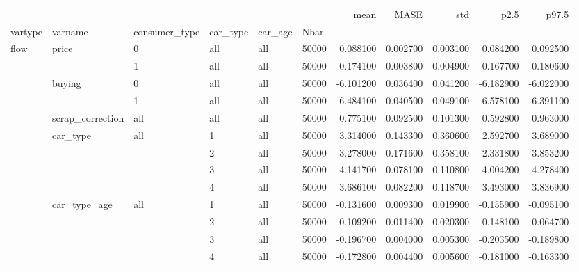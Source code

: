 \begin{tabular}{llllllrrrrr}
\toprule
 &  &  &  &  &  & mean & MASE & std & p2.5 & p97.5 \\
vartype & varname & consumer_type & car_type & car_age & Nbar &  &  &  &  &  \\
\midrule
\multirow[t]{13}{*}{flow} & \multirow[t]{2}{*}{price} & 0 & all & all & 50000 & 0.088100 & 0.002700 & 0.003100 & 0.084200 & 0.092500 \\
\cline{3-11} \cline{4-11} \cline{5-11}
 &  & 1 & all & all & 50000 & 0.174100 & 0.003800 & 0.004900 & 0.167700 & 0.180600 \\
\cline{2-11} \cline{3-11} \cline{4-11} \cline{5-11}
 & \multirow[t]{2}{*}{buying} & 0 & all & all & 50000 & -6.101200 & 0.036400 & 0.041200 & -6.182900 & -6.022000 \\
\cline{3-11} \cline{4-11} \cline{5-11}
 &  & 1 & all & all & 50000 & -6.484100 & 0.040500 & 0.049100 & -6.578100 & -6.391100 \\
\cline{2-11} \cline{3-11} \cline{4-11} \cline{5-11}
 & scrap_correction & all & all & all & 50000 & 0.775100 & 0.092500 & 0.101300 & 0.592800 & 0.963000 \\
\cline{2-11} \cline{3-11} \cline{4-11} \cline{5-11}
 & \multirow[t]{4}{*}{car_type} & \multirow[t]{4}{*}{all} & 1 & all & 50000 & 3.314000 & 0.143300 & 0.360600 & 2.592700 & 3.689000 \\
\cline{4-11} \cline{5-11}
 &  &  & 2 & all & 50000 & 3.278000 & 0.171600 & 0.358100 & 2.331800 & 3.853200 \\
\cline{4-11} \cline{5-11}
 &  &  & 3 & all & 50000 & 4.141700 & 0.078100 & 0.110800 & 4.004200 & 4.278400 \\
\cline{4-11} \cline{5-11}
 &  &  & 4 & all & 50000 & 3.686100 & 0.082200 & 0.118700 & 3.493000 & 3.836900 \\
\cline{2-11} \cline{3-11} \cline{4-11} \cline{5-11}
 & \multirow[t]{4}{*}{car_type_age} & \multirow[t]{4}{*}{all} & 1 & all & 50000 & -0.131600 & 0.009300 & 0.019900 & -0.155900 & -0.095100 \\
\cline{4-11} \cline{5-11}
 &  &  & 2 & all & 50000 & -0.109200 & 0.011400 & 0.020300 & -0.148100 & -0.064700 \\
\cline{4-11} \cline{5-11}
 &  &  & 3 & all & 50000 & -0.196700 & 0.004000 & 0.005300 & -0.203500 & -0.189800 \\
\cline{4-11} \cline{5-11}
 &  &  & 4 & all & 50000 & -0.172800 & 0.004400 & 0.005600 & -0.181000 & -0.163300 \\
\cline{1-11} \cline{2-11} \cline{3-11} \cline{4-11} \cline{5-11}

\end{tabular}
